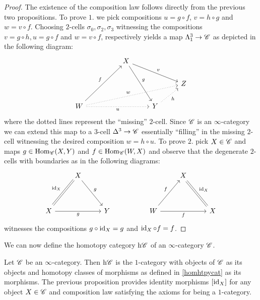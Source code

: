 \documentclass[../../thesis.tex]{subfiles}
\begin{document}
\begin{proof}
    The existence of the composition law follows directly from the previous two propositions.
    To prove $1.$ we pick compositions $u = g\circ f$, $v = h\circ g$ and $w = v\circ f$.
    Choosing $2$-cells $\sigma_0, \sigma_2, \sigma_3$ witnessing the compositions $v = g\circ h, u = g\circ f$ and $w = v \circ f$, respectively yields a map $\Lambda_1^3 \to \mathscr{C}$ as depicted in the following diagram:
    \[\begin{tikzcd}
            && X \\
            &&&& Z \\
            W &&& Y
            \arrow["w", dotted, from=3-1, to=2-5]
            \arrow["f", from=3-1, to=1-3]
            \arrow["v",from=1-3, to=2-5]
            \arrow["h"', dotted, from=3-4, to=2-5]
            \arrow["g", from=1-3, to=3-4]
            \arrow["u"', dotted, from=3-1, to=3-4]
        \end{tikzcd}\]
    where the dotted lines represent the ``missing'' $2$-cell.
    Since $\mathscr{C}$ is an $\infty$-category we can extend this map to a $3$-cell $\Delta^3 \to \mathscr{C}$ essentially ``filling'' in the missing $2$-cell witnessing the desired composition $w = h \circ u$.
    \newline
    To prove $2.$ pick $X\in \mathscr{C}$ and maps $g \in \mathrm{Hom}_{\mathscr{C}}(X,Y)$ and $f \in \mathrm{Hom}_{\mathscr{C}}(W,X)$ and observe that the degenerate $2$-cells with boundaries as in the following diagrams:
    \[\begin{tikzcd}
            & X &&&& X \\
            \\
            X && Y && W && X
            \arrow["g"', from=3-1, to=3-3]
            \arrow["g", from=1-2, to=3-3]
            \arrow[no head, from=3-1, to=1-2]
            \arrow["{\id_X}"', shift right=1, no head, from=1-2, to=3-1]
            \arrow["f", from=3-5, to=1-6]
            \arrow["f"', from=3-5, to=3-7]
            \arrow[shift right=1, no head, from=1-6, to=3-7]
            \arrow["{\id_X}"', no head, from=3-7, to=1-6]
        \end{tikzcd}\]
    witnesses the compositions $g \circ \operatorname{id}_X = g$ and $\operatorname{id}_X \circ f = f$.
\end{proof}
We can now define the homotopy category $\mathrm{h}\mathscr{C}$ of an $\infty$-category $\mathscr{C}$.
\begin{definition}
    Let $\mathscr{C}$ be an $\infty$-category.
    Then $\mathrm{h}\mathscr{C}$ is the $1$-category with objects of $\mathscr{C}$ as its objects and homotopy classes of morphisms as defined in \ref{homhtpycat} as its morphisms.
    The previous proposition provides identity morphisms $[\operatorname{id}_X]$ for any object $X\in \mathscr{C}$ and composition law satisfying the axioms for being a $1$-category.
\end{definition}
\end{document}
